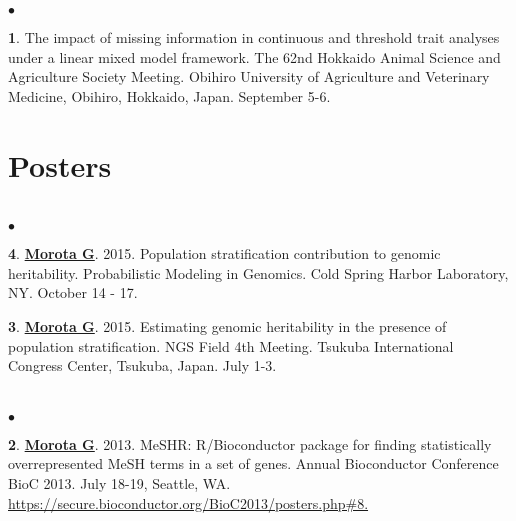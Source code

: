 \documentclass[margin,line,10pt]{res}
\newenvironment{list2}{
  \begin{list}{$\bullet$}{%
      \setlength{\itemsep}{0in}
      \setlength{\parsep}{0in} \setlength{\parskip}{0in}
      \setlength{\topsep}{0in} \setlength{\partopsep}{0in} 
      \setlength{\leftmargin}{0.2in}}}{\end{list}}
\begin{document}
\begin{resume}
\section{}
\begin{list2}
\item  [{\bf 1}.] The impact of missing information in continuous and threshold trait analyses under a linear mixed model framework. The 62nd Hokkaido Animal Science and Agriculture Society Meeting. Obihiro University of Agriculture and Veterinary Medicine, Obihiro, Hokkaido, Japan. September 5-6.
\end{list2}


\vspace{0.5cm}
\section{ \sc Posters }
\vspace{0.5cm}
\section{}
\begin{list2}

\item  [{\bf 4}.] \textbf{\underline{Morota G}}. 2015. Population stratification contribution to genomic heritability. Probabilistic Modeling in Genomics. Cold Spring Harbor Laboratory, NY. October 14 - 17. 

  \vspace{0.5cm}
  
\item  [{\bf 3}.] \textbf{\underline{Morota G}}. 2015. Estimating genomic heritability in the presence of population stratification. NGS Field 4th Meeting. Tsukuba International Congress Center, Tsukuba, Japan. July 1-3. 
\end{list2}

\section{}
\begin{list2}
\item   [{\bf 2}.]  \textbf{\underline{Morota G}}. 2013. MeSHR: R/Bioconductor package for finding statistically overrepresented  MeSH terms in a set of genes. Annual Bioconductor Conference BioC 2013. July 18-19, Seattle, WA. \\ \textcolor{blue}{\href{https://secure.bioconductor.org/BioC2013/posters.php\#7}{https://secure.bioconductor.org/BioC2013/posters.php\#8. } }  


\end{list2}
\end{resume}
\end{document}
